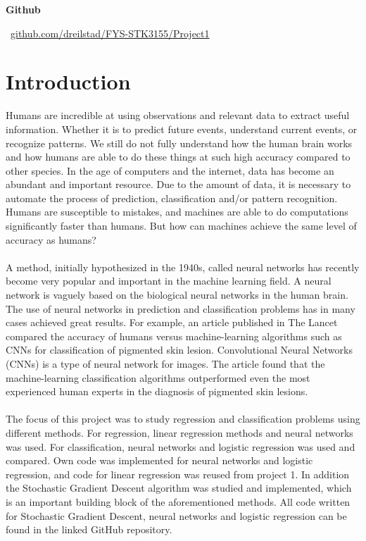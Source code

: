 \documentclass[a4paper,twocolumn]{article}
\begin{document}
\raggedbottom
\begin{center}
    \small \textbf{Github}
    
    \vspace{0.2cm}
    
    \faGithub \ \small \href{https://github.com/dreilstad/FYS-STK3155/tree/master/Project1}{github.com/dreilstad/FYS-STK3155/Project1}
\end{center}
\vspace{0.5cm}
\section{Introduction}
Humans are incredible at using observations and relevant data to extract useful information. Whether it is to predict future events, understand current events, or recognize patterns. We still do not fully understand how the human brain works and how humans are able to do these things at such high accuracy compared to other species. In the age of computers and the internet, data has become an abundant and important resource. Due to the amount of data, it is necessary to automate the process of prediction, classification and/or pattern recognition. Humans are susceptible to mistakes, and machines are able to do computations significantly faster than humans. But how can machines achieve the same level of accuracy as humans?\\
\\
A method, initially hypothesized in the 1940s, called neural networks has recently become very popular and important in the machine learning field. A neural network is vaguely based on the biological neural networks in the human brain. The use of neural networks in prediction and classification problems has in many cases achieved great results. For example, an article\cite{skin} published in The Lancet compared the accuracy of humans versus machine-learning algorithms such as CNNs for classification of pigmented skin lesion. Convolutional Neural Networks (CNNs) is a type of neural network for images. The article found that the machine-learning classification algorithms outperformed even the most experienced human experts in the diagnosis of pigmented skin lesions.\\
\\
The focus of this project was to study regression and classification problems using different methods. For regression, linear regression methods and neural networks was used. For classification, neural networks and logistic regression was used and compared. Own code was implemented for neural networks and logistic regression, and code for linear regression was reused from project 1.\cite{project1} In addition the Stochastic Gradient Descent algorithm was studied and implemented, which is an important building block of the aforementioned methods. All code written for Stochastic Gradient Descent, neural networks and logistic regression can be found in the linked GitHub repository. \\
\end{document}
